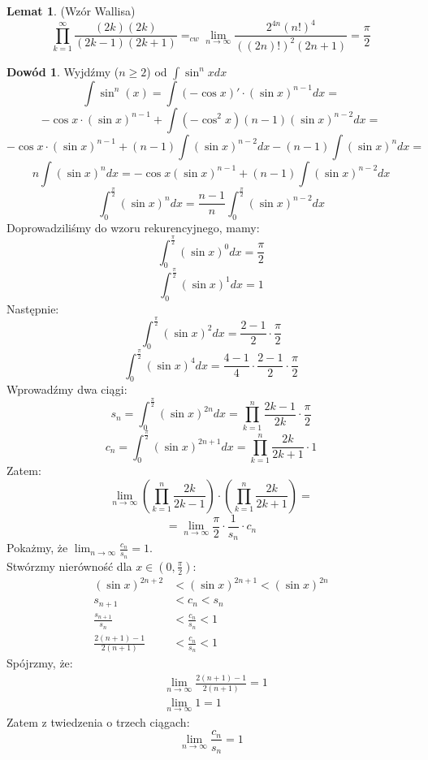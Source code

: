\documentclass{article}
\theoremstyle{definition}
\theoremstyle{definition}
\newtheorem{dd}{Dowód}[subsection]
\theoremstyle{definition}
\theoremstyle{definition}
\newtheorem{lemat}{Lemat}[subsection]
\theoremstyle{definition}
\theoremstyle{definition}
\begin{document}
\begin{lemat}
    (Wzór Wallisa) 
    \[\prod_{k=1}^{\infty} \frac{(2k)(2k)}{(2k-1)(2k+1)}=_{cw}
    \lim_{n\rightarrow \infty} \frac{2^{4n} \left(n!\right)^4}{((2n)!)^2(2n+1)} = \frac{\pi}{2}\]
\end{lemat}

\begin{dd}
    Wyjdźmy ($n\geq 2$) od $\int \sin^n x dx$
    \[\int \sin^n(x) = \int (-\cos x)' \cdot (\sin x)^{n-1} dx =\]
    \[- \cos x \cdot \left(\sin x\right)^{n-1} + \int (- \cos^2 x) (n - 1) (\sin x) ^ {n-2} dx =\]
    \[- \cos x \cdot \left(\sin x\right)^{n-1} + (n-1) \int (\sin x)^{n-2} dx - (n-1) \int (\sin x)^n dx=\]
    \[n \int \left(\sin x\right)^{n} dx = - \cos x \left(\sin x\right)^{n-1} + (n-1) \int (\sin x)^{n-2} dx\]
    \[\int_{0}^{\frac{\pi}{2}} (\sin x)^{n} dx = \frac{n-1}{n} \int_{0}^{\frac{\pi}{2}} (\sin x)^{n-2} dx\]
    Doprowadziliśmy do wzoru rekurencyjnego, mamy:
    \[\int_{0}^{\frac{\pi}{2}} (\sin x)^{0} dx = \frac{\pi}{2}\]
    \[\int_{0}^{\frac{\pi}{2}} (\sin x)^{1} dx = 1\]
    Następnie:
    \[\int_{0}^{\frac{\pi}{2}} (\sin x)^{2} dx = \frac{2-1}{2} \cdot \frac{\pi}{2} \]
    \[\int_{0}^{\frac{\pi}{2}} (\sin x)^{4} dx = \frac{4-1}{4} \cdot \frac{2-1}{2} \cdot \frac{\pi}{2} \]
    Wprowadźmy dwa ciągi:
    \[s_n = \int_{0}^{\frac{\pi}{2}} (\sin x)^{2n} dx = \prod_{k=1}^{n} \frac{2k-1}{2k} \cdot \frac{\pi}{2}\]
    \[c_n = \int_{0}^{\frac{\pi}{2}} (\sin x)^{2n+1} dx = \prod_{k=1}^{n} \frac{2k}{2k+1} \cdot 1\]
    Zatem:
    \[\lim_{n\rightarrow \infty} \left(\prod_{k=1}^{n} \frac{2k}{2k-1}\right) \cdot \left(\prod_{k=1}^{n} \frac{2k}{2k+1}\right)=\]
    \[=\lim_{n\rightarrow \infty} \frac{\pi}{2} \cdot \frac{1}{s_n} \cdot c_n\]
    Pokażmy, że $\lim_{n\rightarrow \infty} \frac{c_n}{s_n} = 1$.\\
    Stwórzmy nierówność dla $x\in\left(0,\frac{\pi}{2}\right)$:
    \begin{align}
        (\sin x)^{2n+2} &< (\sin x)^{2n+1} < (\sin x)^{2n}\\
        s_{n+1} &< c_n < s_n\\
        \frac{s_{n+1}}{s_n} &< \frac{c_n}{s_n} < 1\\
        \frac{2(n+1)-1}{2(n+1)} &< \frac{c_n}{s_n} < 1
    \end{align}
    Spójrzmy, że:
    \begin{align}
        &\lim_{n\rightarrow \infty} \frac{2(n+1)-1}{2(n+1)} = 1\\
        &\lim_{n\rightarrow \infty} 1 = 1
    \end{align}
    Zatem z twiedzenia o trzech ciągach:
    \[\lim_{n\rightarrow \infty} \frac{c_n}{s_n} = 1\]
\end{dd}
\end{document}
